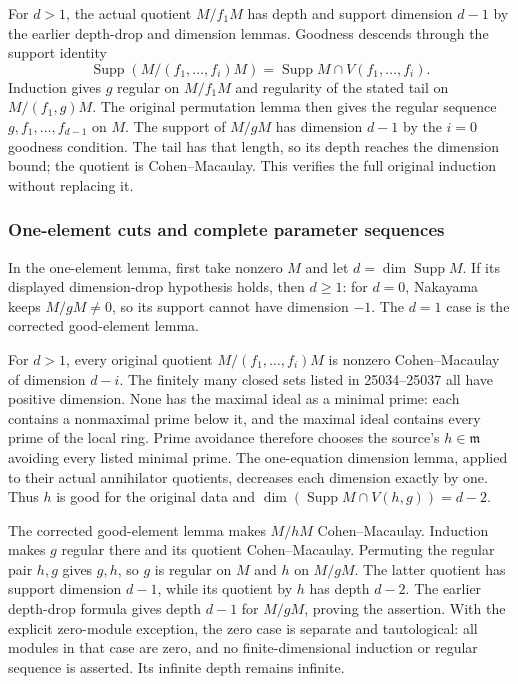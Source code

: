 For \(d>1\), the actual quotient \(M/f_1M\) has depth and support dimension \(d-1\) by the earlier depth-drop and dimension lemmas. Goodness descends through the support identity \[
 \operatorname{Supp}(M/(f_1,\ldots,f_i)M)
 =\operatorname{Supp}M\cap V(f_1,\ldots,f_i).
\] Induction gives \(g\) regular on \(M/f_1M\) and regularity of the stated tail on \(M/(f_1,g)M\). The original permutation lemma then gives the regular sequence \(g,f_1,\ldots,f_{d-1}\) on \(M\). The support of \(M/gM\) has dimension \(d-1\) by the \(i=0\) goodness condition. The tail has that length, so its depth reaches the dimension bound; the quotient is Cohen--Macaulay. This verifies the full original induction without replacing it.

\subsubsection{One-element cuts and complete parameter sequences}\label{algebra-proof-019-one-element-cuts-and-complete-parameter-sequences}

In the one-element lemma, first take nonzero \(M\) and let \(d=\dim\operatorname{Supp}M\). If its displayed dimension-drop hypothesis holds, then \(d\ge1\): for \(d=0\), Nakayama keeps \(M/gM\ne0\), so its support cannot have dimension \(-1\). The \(d=1\) case is the corrected good-element lemma.

For \(d>1\), every original quotient \(M/(f_1,\ldots,f_i)M\) is nonzero Cohen--Macaulay of dimension \(d-i\). The finitely many closed sets listed in 25034--25037 all have positive dimension. None has the maximal ideal as a minimal prime: each contains a nonmaximal prime below it, and the maximal ideal contains every prime of the local ring. Prime avoidance therefore chooses the source's \(h\in\mathfrak m\) avoiding every listed minimal prime. The one-equation dimension lemma, applied to their actual annihilator quotients, decreases each dimension exactly by one. Thus \(h\) is good for the original data and \(\dim(\operatorname{Supp}M\cap V(h,g))=d-2\).

The corrected good-element lemma makes \(M/hM\) Cohen--Macaulay. Induction makes \(g\) regular there and its quotient Cohen--Macaulay. Permuting the regular pair \(h,g\) gives \(g,h\), so \(g\) is regular on \(M\) and \(h\) on \(M/gM\). The latter quotient has support dimension \(d-1\), while its quotient by \(h\) has depth \(d-2\). The earlier depth-drop formula gives depth \(d-1\) for \(M/gM\), proving the assertion. With the explicit zero-module exception, the zero case is separate and tautological: all modules in that case are zero, and no finite-dimensional induction or regular sequence is asserted. Its infinite depth remains infinite.

